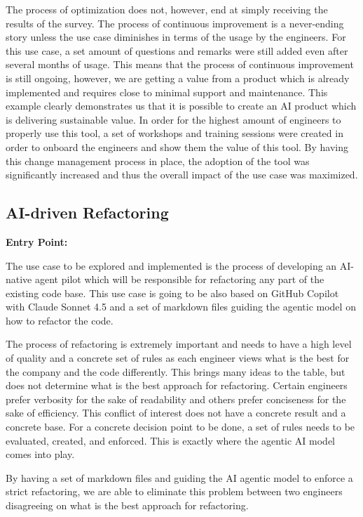 \documentclass[]{imc-inf}
\begin{document}
The process of optimization does not, however, end at simply receiving the results of the survey. The process of continuous improvement is a never-ending story unless the use case diminishes in terms of the usage by the engineers. For this use case, a set amount of questions and remarks were still added even after several months of usage. This means that the process of continuous improvement is still ongoing, however, we are getting a value from a product which is already implemented and requires close to minimal support and maintenance. This example clearly demonstrates us that it is possible to create an AI product which is delivering sustainable value. In order for the highest amount of engineers to properly use this tool, a set of workshops and training sessions were created in order to onboard the engineers and show them the value of this tool. By having this change management process in place, the adoption of the tool was significantly increased and thus the overall impact of the use case was maximized.

\subsection{AI-driven Refactoring}\label{ai-driven-refactoring}
\textbf{Entry Point:}

The use case to be explored and implemented is the process of developing an AI-native agent pilot which will be responsible for refactoring any part of the existing code base. This use case is going to be also based on GitHub Copilot with Claude Sonnet 4.5 and a set of markdown files guiding the agentic model on how to refactor the code. 

The process of refactoring is extremely important and needs to have a high level of quality and a concrete set of rules as each engineer views what is the best for the company and the code differently. This brings many ideas to the table, but does not determine what is the best approach for refactoring. Certain engineers prefer verbosity for the sake of readability and others prefer conciseness for the sake of efficiency. This conflict of interest does not have a concrete result and a concrete base. For a concrete decision point to be done, a set of rules needs to be evaluated, created, and enforced. This is exactly where the agentic AI model comes into play. 

By having a set of markdown files and guiding the AI agentic model to enforce a strict refactoring, we are able to eliminate this problem between two engineers disagreeing on what is the best approach for refactoring. 
\end{document}
